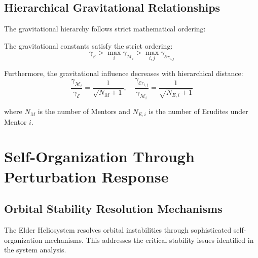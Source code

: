 \subsection{Hierarchical Gravitational Relationships}

The gravitational hierarchy follows strict mathematical ordering:

\begin{theorem}
\label{thm:gfp_hierarchy}
The gravitational constants satisfy the strict ordering:
\begin{equation}
\gamma_{\mathcal{E}} > \max_i \gamma_{\mathcal{M}_i} > \max_{i,j} \gamma_{\mathcal{E}r_{i,j}}
\end{equation}

Furthermore, the gravitational influence decreases with hierarchical distance:
\begin{equation}
\frac{\gamma_{\mathcal{M}_i}}{\gamma_{\mathcal{E}}} = \frac{1}{\sqrt{N_M + 1}}, \quad \frac{\gamma_{\mathcal{E}r_{i,j}}}{\gamma_{\mathcal{M}_i}} = \frac{1}{\sqrt{N_{E,i} + 1}}
\end{equation}

where $N_M$ is the number of Mentors and $N_{E,i}$ is the number of Erudites under Mentor $i$.
\end{theorem}

\section{Self-Organization Through Perturbation Response}

\subsection{Orbital Stability Resolution Mechanisms}

The Elder Heliosystem resolves orbital instabilities through sophisticated self-organization mechanisms. This addresses the critical stability issues identified in the system analysis.

